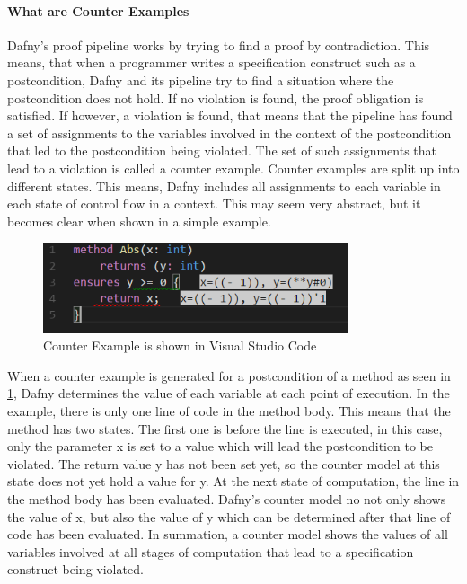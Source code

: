 \paragraph{What are Counter Examples}
Dafny's proof pipeline works by trying to find a proof by contradiction. This means, that when a programmer writes a specification construct such as a postcondition, Dafny and its pipeline try to find a situation where the postcondition does not hold. If no violation is found, the proof obligation is satisfied. \newline
If however, a violation is found, that means that the pipeline has found a set of assignments to the variables involved in the context of the postcondition that led to the postcondition being violated. The set of such assignments that lead to a violation is called a counter example. \newline
Counter examples are split up into different states. This means, Dafny includes all assignments to each variable in each state of control flow in a context. This may seem very abstract, but it becomes clear when shown in a simple example. \newline
\begin{figure}[H]
	\centering
	\includegraphics[width=0.8\textwidth]{img/counterModel}
	\caption{Counter Example is shown in Visual Studio Code}
	\label{fig:dfcounterModel}
\end{figure}
When a counter example is generated for a postcondition of a method as seen in \ref{fig:dfcounterModel}, Dafny determines the value of each variable at each point of execution. In the example, there is only one line of code in the method body. This means that the method has two states. The first one is before the line is executed, in this case, only the parameter x is set to a value which will lead the postcondition to be violated. The return value y has not been set yet, so the counter model at this state does not yet hold a value for y. \newline
At the next state of computation, the line in the method body has been evaluated. Dafny's counter model no not only shows the value of x, but also the value of y which can be determined after that line of code has been evaluated. \newline
In summation, a counter model shows the values of all variables involved at all stages of computation that lead to a specification construct being violated. 
